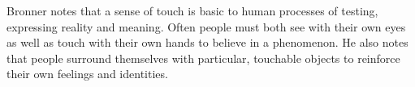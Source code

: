 \documentclass{chi-ext}
\begin{document}

Bronner notes that a sense of touch is basic to human processes of testing, expressing reality and meaning. Often people must both see with their own eyes as well as touch with their own hands to believe in a phenomenon\cite{bronner1982haptic}. He also notes that people surround themselves with particular, touchable objects to reinforce their own feelings and identities. 







\end{document}
